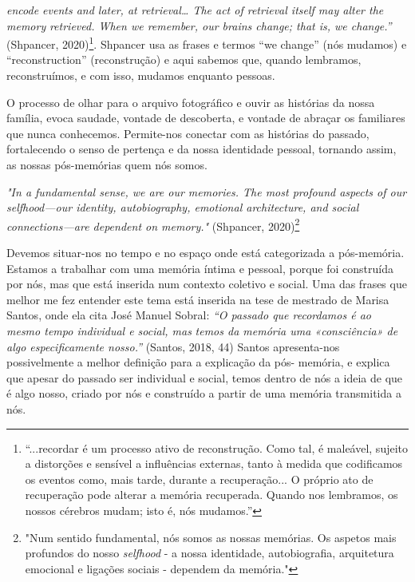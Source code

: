 \documentclass{article}
\begin{document}
 



\textit{encode events and later, at retrieval… The act of retrieval itself may alter the memory }
\textit{retrieved.  When  we  remember,  our  brains  change;  that  is,  we  change.”}  (Shpancer, 
2020)\footnote{“...recordar é um processo ativo de reconstrução. Como tal, é maleável, sujeito a distorções e sensível a influências externas, tanto à medida que codificamos os eventos como, mais tarde, durante a recuperação... O próprio ato de recuperação pode alterar a memória recuperada. Quando nos lembramos, os nossos cérebros mudam; isto é, nós mudamos.” }. Shpancer usa as frases e termos “we change” (nós mudamos) e “reconstruction” 
(reconstrução)  e  aqui  sabemos  que,  quando  lembramos,  reconstruímos,  e  com  isso, 
mudamos enquanto pessoas.  
 
O  processo  de  olhar  para  o  arquivo  fotográfico  e  ouvir  as  histórias  da  nossa 
família, evoca saudade, vontade de descoberta, e vontade de abraçar os familiares que 
nunca  conhecemos.  Permite-nos  conectar  com  as  histórias  do  passado,  fortalecendo  o 
senso de pertença e da nossa identidade pessoal, tornando assim, as nossas pós-memórias 
quem nós somos.  
 
\textit{"In a fundamental sense, we are our memories. The most profound aspects of our }
\textit{selfhood—our identity, autobiography, emotional architecture, and social }
\textit{connections—are dependent on memory." }(Shpancer, 2020)\footnote{"Num sentido fundamental, nós somos as nossas memórias. Os aspetos mais profundos do nosso \textit{selfhood} - a nossa identidade, autobiografia, arquitetura emocional e ligações sociais - dependem da memória." } 
 
 
Devemos situar-nos no tempo e no espaço onde está categorizada a pós-memória. 
Estamos a trabalhar com uma memória íntima e pessoal, porque foi construída por nós, 
mas que está inserida num contexto coletivo e social. Uma das frases que melhor me fez 
entender este tema está inserida na tese de mestrado de Marisa Santos, onde ela cita José 
Manuel Sobral: \textit{“O passado que recordamos é ao mesmo tempo individual e social, mas }
\textit{temos da memória uma «consciência» de algo especificamente nosso.”} (Santos, 2018, 
44)  Santos  apresenta-nos  possivelmente  a  melhor  definição  para  a  explicação  da  pós-
memória, e explica que apesar do passado ser individual e social, temos dentro de nós a 
ideia de que é algo nosso, criado por nós e construído a partir de uma memória transmitida 
a nós.  
 
\end{document}
